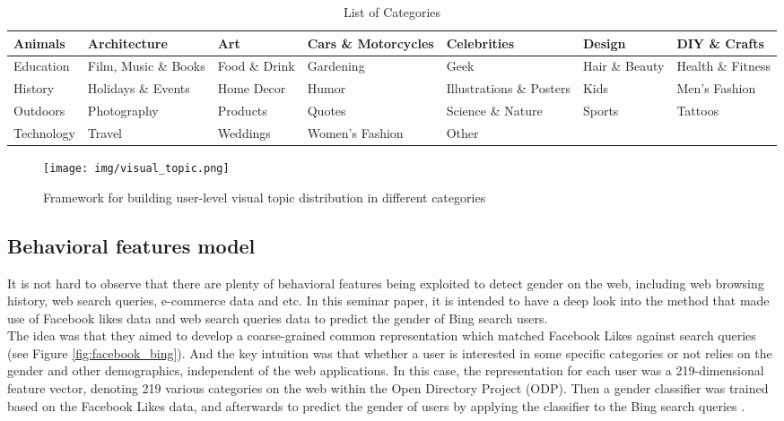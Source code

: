 \documentclass[runningheads]{llncs}
\begin{document}
	\begin{table}
		\caption{List of Categories}
		\hskip-2.5cm \begin{tabular}{| l | l | l | l | l | l | l | }
			\hline
			Animals & Architecture
			& Art & Cars \& Motorcycles & Celebrities
			& Design
			& DIY \& Crafts \\
			\hline
			Education & Film, Music \& Books & 
			Food \& Drink  & Gardening & Geek
			& Hair \& Beauty
			& Health \& Fitness \\
			\hline
			History & Holidays \& Events
			& Home Decor &  Humor & Illustrations \& Posters
			& Kids
			& Men’s Fashion \\
			\hline
			Outdoors & Photography
			& Products
			& Quotes & Science \& Nature
			& Sports
			& Tattoos \\
			\hline
			Technology & Travel
			& Weddings
			& Women’s Fashion & Other & &  \\
			\hline
		\end{tabular}
		\label{table:list-categories}
	\end{table}
	
	\begin{figure}
		\centering
		\texttt{[image: img/visual\_topic.png]}
		\caption{Framework for building user-level visual topic distribution in different categories}
		\label{fig:visual_topic}
	\end{figure}
	
	\subsection{Behavioral features model}
	
	It is not hard to observe that there are plenty of behavioral features being exploited to detect gender on the web, including web browsing history, web search queries, e-commerce data and etc. In this seminar paper, it is intended to have a deep look into the method that made use of Facebook likes data and web search queries data to predict the gender of Bing search users. \\
	
	The idea was that they aimed to develop a coarse-grained common representation which matched Facebook Likes against search queries (see Figure \ref{fig:facebook_bing}). And the key intuition was that whether a user is interested in some specific categories or not relies on the gender and other demographics, independent of the web applications. In this case, the representation for each user was a 219-dimensional feature vector, denoting 219 various categories on the web within the Open Directory Project (ODP). Then a gender classifier was trained based on the Facebook Likes data, and afterwards to predict the gender of users by applying the classifier to the Bing search queries \cite{bi2013inferring}. \\
	
\end{document}
